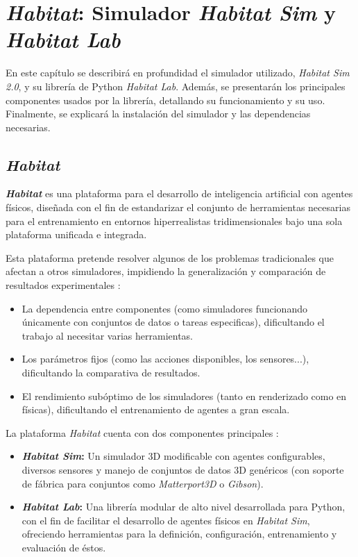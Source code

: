 
\chapter{\textit{Habitat}: Simulador \textit{Habitat Sim} y \textit{Habitat Lab}}

En este capítulo se describirá en profundidad el simulador utilizado, \textit{Habitat Sim 2.0}, y su librería de Python \textit{Habitat Lab}. Además, se presentarán los principales componentes usados por la librería, detallando su funcionamiento y su uso. Finalmente, se explicará la instalación del simulador y las dependencias necesarias.

\section{\textit{Habitat}}

\textbf{\textit{Habitat}} \cite{habitat19iccv} es una plataforma para el desarrollo de inteligencia artificial con agentes físicos, diseñada con el fin de estandarizar el conjunto de herramientas necesarias para el entrenamiento en entornos hiperrealistas tridimensionales bajo una sola plataforma unificada e integrada.

Esta plataforma pretende resolver algunos de los problemas tradicionales que afectan a otros simuladores, impidiendo la generalización y comparación de resultados experimentales \cite{habitat19iccv}:
\begin{itemize}
	\item La dependencia entre componentes (como simuladores funcionando únicamente con conjuntos de datos o tareas especificas), dificultando el trabajo al necesitar varias herramientas.
	\item Los parámetros fijos (como las acciones disponibles, los sensores...), dificultando la comparativa de resultados.
	\item El rendimiento subóptimo de los simuladores (tanto en renderizado como en físicas), dificultando el entrenamiento de agentes a gran escala. 
\end{itemize}

La plataforma \textit{Habitat} cuenta con dos componentes principales \cite{habitat19iccv}:
\begin{itemize}
	\item \textbf{\textit{Habitat Sim}:} Un simulador 3D modificable con agentes configurables, diversos sensores y manejo de conjuntos de datos 3D genéricos (con soporte de fábrica para conjuntos como \textit{Matterport3D} o \textit{Gibson}).
	\item \textbf{\textit{Habitat Lab}:} Una librería modular de alto nivel desarrollada para Python, con el fin de facilitar el desarrollo de agentes físicos en \textit{Habitat Sim}, ofreciendo herramientas para la definición, configuración, entrenamiento y evaluación de éstos.
\end{itemize}

